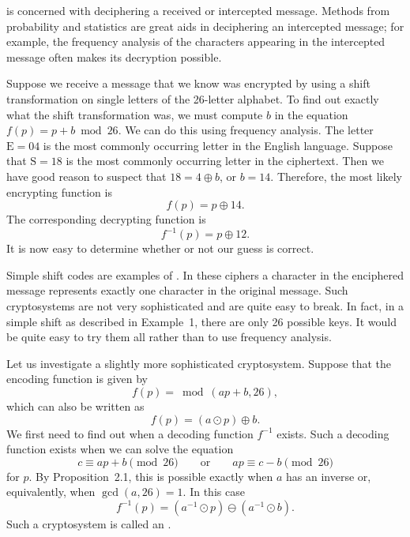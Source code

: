  
\medskip
 
 
 is concerned with
deciphering a received or intercepted message. Methods from
probability and statistics are great aids in deciphering an
intercepted message; for example, the frequency analysis of the
characters appearing in the intercepted message often makes its
decryption possible.  
 
 
\medskip
 
 
\begin{example}
Suppose we receive a message that we know was encrypted by using a
shift transformation on single letters of the 26-letter alphabet. To
find out exactly what the shift transformation was, we must compute
$b$ in the equation $f(p) = p + b \bmod 26$. We can do this using
frequency analysis.  The letter $\mbox{E} = 04$ is the most commonly
occurring letter in the English language. Suppose that $\mbox{S} = 18$
is the most commonly occurring letter in the ciphertext.  Then we have
good reason to suspect that  $18 = 4 \oplus b $, or $b= 14$.
Therefore, the most likely encrypting function is
$$
f(p) = p \oplus 14.
$$
The corresponding decrypting function is
$$
f^{-1}(p) = p \oplus 12.
$$
It is now easy to determine whether or not our guess is correct.
\end{example}
 
 
\medskip
 
 
Simple shift codes are examples of . In these ciphers a
character in the enciphered message represents exactly one character
in the original message. Such cryptosystems are not very sophisticated
and are quite easy to break. In fact, in a simple shift as described
in Example~1, there are only 26 possible keys. It would be quite easy
to try them all rather than to use frequency analysis. 
 
 
Let us investigate a slightly more sophisticated cryptosystem. Suppose
that the encoding function is given by  
$$
f(p) = \bmod(ap + b,  26),
$$
which can also be written as
$$
f(p) = (a \odot p) \oplus b.
$$
We first need to find out when a decoding function $f^{-1}$ exists.
Such a decoding function exists when we can solve the equation
$$
c \equiv ap + b \pmod{26}\qquad \textrm{or}\qquad ap \equiv c - b \pmod{26}
$$
for $p$. By Proposition~2.1, this is possible exactly when $a$ has an
inverse or, equivalently, when $\gcd( a, 26) =1$. In this case 
$$
f^{-1}(p) = (a^{-1} \odot p)  \ominus (a^{-1}\odot b).
$$
Such a cryptosystem is called an . 
  
